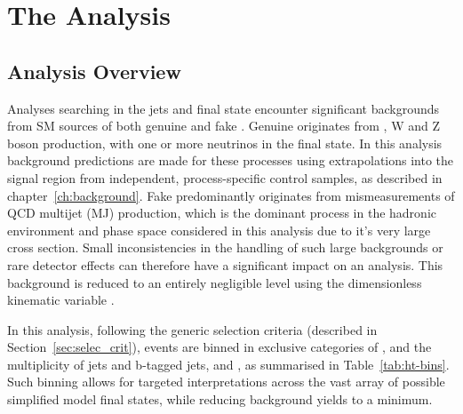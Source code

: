 \chapter{The \alphat Analysis}
\label{ch:analysis}

\ifpdf
    \graphicspath{{Chapter5/Figs/Raster/}{Chapter5/Figs/PDF/}{Chapter5/Figs/}}
\else
    \graphicspath{{Chapter5/Figs/Vector/}{Chapter5/Figs/}}
\fi


\section{Analysis Overview}  %
\label{sec:selection_analysis_overview}

Analyses searching in the jets and \met final state encounter significant 
backgrounds from SM sources of both genuine and fake \met. Genuine \met 
originates from \ttbar, W and Z boson production, with one or more
neutrinos in the final state. In this analysis background predictions are made
for these processes using 
extrapolations into the signal region from independent, process-specific control
samples, as described in chapter~\ref{ch:background}.
Fake \met predominantly originates from mismeasurements of QCD 
multijet (MJ) production, which is the dominant process in the hadronic
environment
and  phase space considered in this analysis due to it's very large cross
section.  Small inconsistencies in the handling of such large backgrounds or
rare detector effects can therefore 
have a significant impact on an analysis. This background is reduced to an 
entirely negligible level using the dimensionless kinematic variable \alphat.


In this analysis, following the generic selection criteria (described in
Section~\ref{sec:selec_crit}), events are binned in exclusive categories of \HT, 
and the multiplicity of jets and b-tagged jets,  
\nj and \nb, as summarised in Table~\ref{tab:ht-bins}. Such binning allows for
targeted interpretations across the vast array of
possible simplified model final states, while reducing background yields to a 
minimum.

